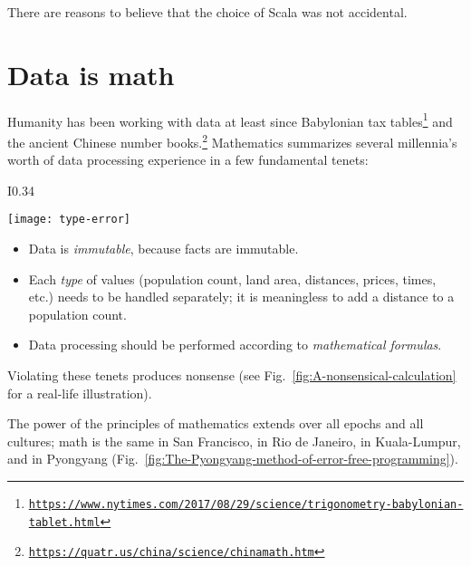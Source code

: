 There are reasons to believe that the choice of Scala was not accidental.

\section{Data is math}

Humanity has been working with data at least since Babylonian tax
tables\footnote{\texttt{\href{https://www.nytimes.com/2017/08/29/science/trigonometry-babylonian-tablet.html}{https://www.nytimes.com/2017/08/29/science/trigonometry-babylonian-tablet.html}}}
and the ancient Chinese number books.\footnote{\texttt{\href{https://web.archive.org/web/20170425233550/https://quatr.us/china/science/chinamath.htm}{https://quatr.us/china/science/chinamath.htm}}}
Mathematics summarizes several millennia\textsf{'}s worth of data processing
experience in a few fundamental tenets:

\begin{wrapfigure}{I}{0.34\columnwidth}%
\begin{centering}
\vspace{-0.65\baselineskip}
\texttt{[image: type-error]}\vspace{-0.5\baselineskip}
\par\end{centering}
\caption{Mixing incompatible data types produces nonsensical results.\label{fig:A-nonsensical-calculation}}

\vspace{-3.5\baselineskip}
\end{wrapfigure}%

\begin{itemize}
\item Data is \emph{immutable}, because facts are immutable. 
\item Each \emph{type} of values (population count, land area, distances,
prices, times, etc.) needs to be handled separately; it is meaningless
to add a distance to a population count.
\item Data processing should be performed according to \emph{mathematical
formulas}. 
\end{itemize}
Violating these tenets produces nonsense (see Fig.\ \ref{fig:A-nonsensical-calculation}
for a real-life illustration).

The power of the principles of mathematics extends over all epochs
and all cultures; math is the same in San Francisco, in Rio de Janeiro,
in Kuala-Lumpur, and in Pyongyang (Fig.\ \ref{fig:The-Pyongyang-method-of-error-free-programming}).


